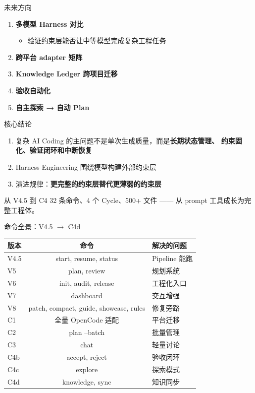 \documentclass[theme=workflow,aspectratio=169,fontset=tech]{Hypo-Slide}
\begin{document}
\begin{frame}{未来方向}
  \begin{enumerate}
    \item \textbf{多模型 Harness 对比}
    \begin{itemize}
      \item 验证约束层能否让中等模型完成复杂工程任务
    \end{itemize}
    \item \textbf{跨平台 adapter 矩阵}
    \item \textbf{Knowledge Ledger 跨项目迁移}
    \item \textbf{验收自动化}
    \item \textbf{自主探索 → 自动 Plan}
  \end{enumerate}
\end{frame}

\begin{frame}{核心结论}
  \begin{enumerate}
    \item 复杂 AI Coding 的主问题不是单次生成质量，而是\textbf{长期状态管理、
      约束固化、验证闭环和中断恢复}
    \item Harness Engineering 围绕模型构建外部约束层
    \item 演进规律：\textbf{更完整的约束层替代更薄弱的约束层}
  \end{enumerate}
  \vspace{0.3cm}
  \begin{block}{从 V4.5 到 C4}
    32 条命令、4 个 Cycle、500+ 文件 ——
    从 prompt 工具成长为完整工程体。
  \end{block}
\end{frame}

\begin{frame}{命令全景：V4.5 $\rightarrow$ C4d}
  \centering
  \small
  \begin{tabularx}{0.9\textwidth}{lcl}
    \toprule
    版本 & 命令 & 解决的问题 \\
    \midrule
    V4.5 & start, resume, status & Pipeline 能跑 \\
    V5   & plan, review & 规划系统 \\
    V6   & init, audit, release & 工程化入口 \\
    V7   & dashboard & 交互增强 \\
    V8   & patch, compact, guide, showcase, rules & 修复旁路 \\
    C1   & 全量 OpenCode 适配 & 平台迁移 \\
    C2   & plan --batch & 批量管理 \\
    C3   & chat & 轻量讨论 \\
    C4b  & accept, reject & 验收闭环 \\
    C4c  & explore & 探索模式 \\
    C4d  & knowledge, sync & 知识同步 \\
    \bottomrule
  \end{tabularx}
\end{frame}
\end{document}
